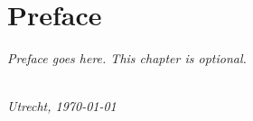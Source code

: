 %
%
%




\chapter*{Preface}

\emph{Preface goes here. This chapter is optional.}

\lipsum[42-49]


\begin{flushright}
{\makeatletter\itshape
    \@firstname\ \@lastname \\
    Utrecht, \monthyeardate\today
\makeatother}
\end{flushright}

